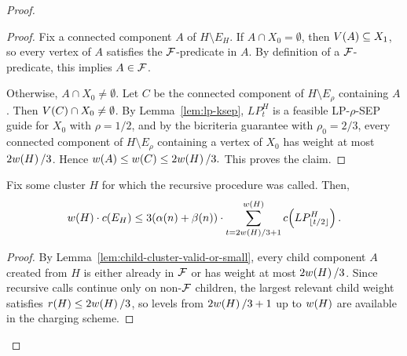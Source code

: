 \begin{proof}
\begin{proof}
        Fix a connected component $A$ of $H\setminus E_H$. If $A\cap X_0=\emptyset$, then $V\mathopen{}\left( A \right)\subseteq X_1$, so every vertex of $A$ satisfies the $\mathcal{F}$-predicate in $A$. By definition of a $\mathcal{F}$-predicate, this implies $A\in\mathcal{F}$.

        Otherwise, $A\cap X_0\neq\emptyset$. Let $C$ be the connected component of $H\setminus E_{\rho}$ containing $A$. Then $V\mathopen{}\left( C \right)\cap X_0\neq\emptyset$. By Lemma~\ref{lem:lp-ksep}, $LP_t^H$ is a feasible \textsc{LP-$\rho$-SEP} guide for $X_0$ with $\rho=1/2$, and by the bicriteria guarantee with $\rho_0=2/3$, every connected component of $H\setminus E_{\rho}$ containing a vertex of $X_0$ has weight at most $2w\mathopen{}\left( H \right)/3$. Hence $w\mathopen{}\left( A \right)\leq w\mathopen{}\left( C \right)\leq 2w\mathopen{}\left( H \right)/3.$
        This proves the claim.
    \end{proof}

    \begin{lemma}\label{lem:recursive-cost}
        Fix some cluster $H$ for which the recursive procedure was called. Then, 
        \[
        w\mathopen{}\left( H \right)\cdot c\mathopen{}\left( E_H \right)\leq 3\mathopen{}\left( \alpha\mathopen{}\left( n \right)+\beta\mathopen{}\left( n \right) \right)\cdot \sum_{t=2w\mathopen{}\left( H \right)/3+1}^{w\mathopen{}\left( H \right)} c\mathopen{}\left( LP_{\mathopen{}\left\lfloor t/2 \right\rfloor}^H \right).
        \]
    \end{lemma}
    \begin{proof}
        By Lemma~\ref{lem:child-cluster-valid-or-small}, every child component $A$ created from $H$ is either already in $\mathcal{F}$ or has weight at most $2w\mathopen{}\left( H \right)/3$. Since recursive calls continue only on non-$\mathcal{F}$ children, the largest relevant child weight satisfies $r\mathopen{}\left( H \right)\leq 2w\mathopen{}\left( H \right)/3$, so levels from $2w\mathopen{}\left( H \right)/3+1$ up to $w\mathopen{}\left( H \right)$ are available in the charging scheme.


\end{proof}
\end{proof}
